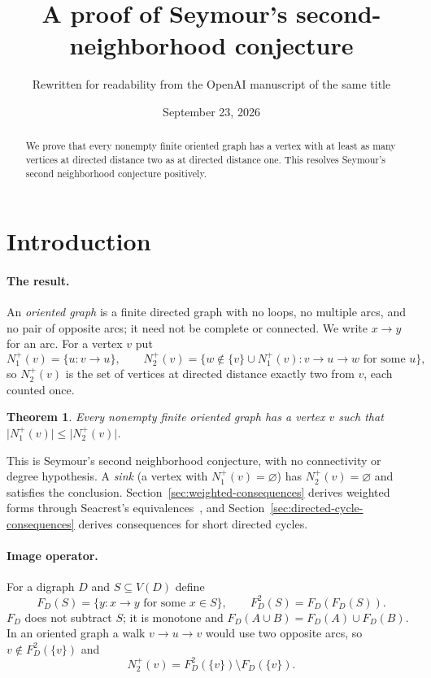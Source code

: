 \documentclass[11pt]{article}
\title{A proof of Seymour's second-neighborhood conjecture}
\author{Rewritten for readability from the OpenAI manuscript of the same title}
\date{September 23, 2026}
\newtheorem{theorem}{Theorem}[section]
\theoremstyle{remark}
\newcommand{\abs}[1]{\lvert #1\rvert}
\begin{document}
\maketitle
\begin{abstract}
We prove that every nonempty finite oriented graph has a vertex with at least
as many vertices at directed distance two as at directed distance one.
This resolves Seymour's second neighborhood conjecture positively.
\end{abstract}

\section{Introduction}\label{sec:introduction}

\paragraph{The result.}
An \emph{oriented graph} is a finite directed graph with no loops, no multiple
arcs, and no pair of opposite arcs; it need not be complete or connected.
We write $x\to y$ for an arc.  For a vertex $v$ put
\[
 N_1^+(v)=\{u:v\to u\},\qquad
 N_2^+(v)=\{w\notin\{v\}\cup N_1^+(v): v\to u\to w\text{ for some }u\},
\]
so $N_2^+(v)$ is the set of vertices at directed distance exactly two from
$v$, each counted once.

\begin{theorem}\label{thm:main}
Every nonempty finite oriented graph has a vertex \(v\) such that
\(\abs{N_1^+(v)}\leq \abs{N_2^+(v)}\).
\end{theorem}

This is Seymour's second neighborhood conjecture, with no connectivity or
degree hypothesis.  A \emph{sink} (a vertex with $N_1^+(v)=\varnothing$) has
$N_2^+(v)=\varnothing$ and satisfies the conclusion.
Section~\ref{sec:weighted-consequences} derives weighted forms through
Seacrest's equivalences~\cite{Seacrest2015}, and
Section~\ref{sec:directed-cycle-consequences} derives consequences for short
directed cycles.

\paragraph{Image operator.}
For a digraph $D$ and $S\subseteq V(D)$ define
\[
 F_D(S)=\{y: x\to y\text{ for some }x\in S\},\qquad F_D^2(S)=F_D(F_D(S)).
\]
$F_D$ does not subtract $S$; it is monotone and
$F_D(A\cup B)=F_D(A)\cup F_D(B)$.  In an oriented graph a walk $v\to u\to v$
would use two opposite arcs, so $v\notin F_D^2(\{v\})$ and
\begin{equation}\label{eq:N2-as-image}
 N_2^+(v)=F_D^2(\{v\})\setminus F_D(\{v\}).
\end{equation}
\end{document}
